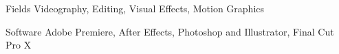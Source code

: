 


\begin{cvskills}


\cvskill
{Fields} %
{Videography, Editing, Visual Effects, Motion Graphics} %


\cvskill
{Software} %
{Adobe Premiere, After Effects, Photoshop and Illustrator, Final Cut Pro X} %


\end{cvskills}
